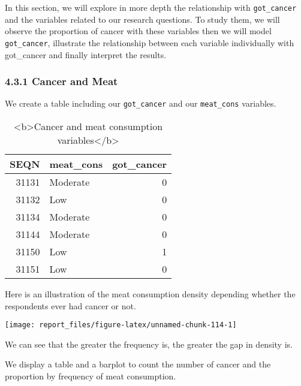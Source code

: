 \documentclass[
]{article}
\begin{document}
In this section, we will explore in more depth the relationship with
\texttt{got\_cancer} and the variables related to our research
questions. To study them, we will observe the proportion of cancer with
these variables then we will model \texttt{got\_cancer}, illustrate the
relationship between each variable individually with got\_cancer and
finally interpret the results.

\hypertarget{cancer-and-meat}{%
\subsubsection{4.3.1 Cancer and Meat}\label{cancer-and-meat}}

We create a table including our \texttt{got\_cancer} and our
\texttt{meat\_cons} variables.

\begin{table}

\caption{\label{tab:unnamed-chunk-113}<b>Cancer and meat consumption variables</b>}
\centering
\begin{tabular}[t]{r|l|r}
\hline
SEQN & meat\_cons & got\_cancer\\
\hline
31131 & Moderate & 0\\
\hline
31132 & Low & 0\\
\hline
31134 & Moderate & 0\\
\hline
31144 & Moderate & 0\\
\hline
31150 & Low & 1\\
\hline
31151 & Low & 0\\
\hline
\end{tabular}
\end{table}

Here is an illustration of the meat consumption density depending
whether the respondents ever had cancer or not.

\begin{center}\texttt{[image: report\_files/figure-latex/unnamed-chunk-114-1]} \end{center}

We can see that the greater the frequency is, the greater the gap in
density is.

We display a table and a barplot to count the number of cancer and the
proportion by frequency of meat consumption.
\end{document}
